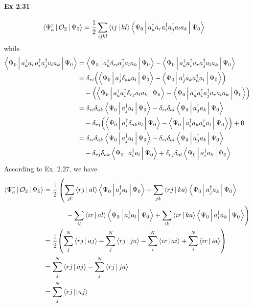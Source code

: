 \documentclass[a4paper]{article}
\newcommand{\ex}[1]{\paragraph{Ex #1}}
\numberwithin{equation}{subsection}
\begin{document}
\ex{2.31}
\begin{align}
\Braket{\Psi_a^r | \mathcal{O}_2 | \Psi_0} &= \dfrac{1}{2} \sum_{ijkl} \Braket{ij|kl} \Braket{\Psi_0 | a_a^\dagger a_r a_i^\dagger a_j^\dagger a_l a_k | \Psi_0} 
\end{align}
while
\begin{align}
\Braket{\Psi_0 | a_a^\dagger a_r a_i^\dagger a_j^\dagger a_l a_k | \Psi_0} 
&= \Braket{\Psi_0 | a_a^\dagger \delta_{ri} a_j^\dagger a_l a_k | \Psi_0} - \Braket{\Psi_0 | a_a^\dagger a_i^\dagger a_r a_j^\dagger a_l a_k | \Psi_0} \notag\\
&= \delta_{ri} \qty(\Braket{\Psi_0 | a_j^\dagger \delta_{ak} a_l | \Psi_0}  - \Braket{\Psi_0 | a_j^\dagger a_k a_a^\dagger a_l | \Psi_0} ) \notag\\ 
  & \quad{} - \qty(\Braket{\Psi_0 | a_a^\dagger a_i^\dagger \delta_{rj} a_l a_k | \Psi_0} - \Braket{\Psi_0 | a_a^\dagger a_i^\dagger a_j^\dagger a_r a_l a_k | \Psi_0})\notag\\
&= \delta_{ri}\delta_{ak} \Braket{\Psi_0 | a_j^\dagger  a_l | \Psi_0}  - \delta_{ri}\delta_{al}\Braket{\Psi_0 | a_j^\dagger a_k | \Psi_0} \notag\\ 
  & \quad{} - \delta_{rj}\qty(\Braket{\Psi_0 | a_i^\dagger \delta_{ak} a_l| \Psi_0} - \Braket{\Psi_0 | a_i^\dagger a_k a_a^\dagger  a_l | \Psi_0} ) + 0 \notag\\
&= \delta_{ri}\delta_{ak} \Braket{\Psi_0 | a_j^\dagger  a_l | \Psi_0}  - \delta_{ri}\delta_{al}\Braket{\Psi_0 | a_j^\dagger a_k | \Psi_0} \notag\\ 
  & \quad{} - \delta_{rj}\delta_{ak} \Braket{\Psi_0 | a_i^\dagger a_l| \Psi_0} + \delta_{rj}\delta_{al} \Braket{\Psi_0 | a_i^\dagger a_k | \Psi_0}
\end{align}
According to Ex. 2.27, we have
\begin{align}
\Braket{\Psi_a^r | \mathcal{O}_2 | \Psi_0} &= \dfrac{1}{2} \left( \sum_{jl}\Braket{rj|al}\Braket{\Psi_0 | a_j^\dagger  a_l | \Psi_0} - \sum_{jk}\Braket{rj|ka}\Braket{\Psi_0 | a_j^\dagger  a_k | \Psi_0}\right. \notag\\
&  \left. \hspace{30pt} {} - \sum_{il}\Braket{ir|al}\Braket{\Psi_0 | a_i^\dagger  a_l | \Psi_0} + \sum_{ik}\Braket{ir|ka}\Braket{\Psi_0 | a_i^\dagger  a_k | \Psi_0}\right) \notag\\
&= \dfrac{1}{2}\qty(\sum_j^N\Braket{rj|aj} - \sum_j^N\Braket{rj|ja} - \sum_i^N\Braket{ir|ai} + \sum_i^N\Braket{ir|ia}) \notag\\
&= \sum_j^N\Braket{rj|aj} - \sum_j^N\Braket{rj|ja} \notag\\
&= \sum_j^N\Braket{rj||aj}
\end{align}
\end{document}
